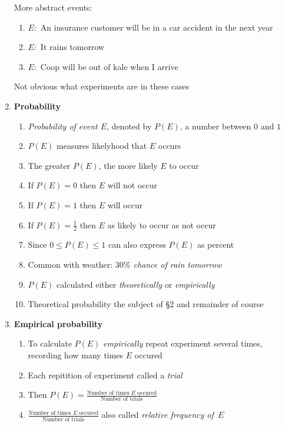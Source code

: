 \documentclass{ximera}
\begin{document}
\begin{enumerate}
\begin{example}
More abstract events:
\begin{enumerate}
\item $E:$ An insurance customer will be in a car accident in the next year
\item $E:$ It rains tomorrow
\item $E:$ Coop will be out of kale when I arrive
\end{enumerate}
Not obvious what experiments are in these cases
\end{example}

\item{\bf Probability}
\begin{enumerate}
\item {\em Probability of event $E$}, denoted by $P\left(E\right)$,
a number between $0$ and $1$
\item $P\left(E\right)$ measures likelyhood that $E$ occurs
\item The greater $P\left(E\right)$, the more likely $E$ to occur
\item If $P\left(E\right)=0$ then $E$ will not occur
\item If $P\left(E\right)=1$ then $E$ will occur
\item If $P\left(E\right)=\frac{1}{2}$ then $E$ 
as likely to occur as not occur
\item Since $0\le P\left(E\right)\le 1$ can also express
$P\left(E\right)$ as percent
\item Common with weather: {\em $30\%$ chance of rain tomorrow}
\item $P\left(E\right)$ calculated either {\em theoretically}
or {\em empirically}
\item Theoretical probability the subject of \S2 and remainder of course
\end{enumerate}

\item{\bf Empirical probability}
\begin{enumerate}
\item To calculate $P\left(E\right)$ {\em empirically}
repeat experiment several times, recording how
many times $E$ occured
\item Each repitition of experiment called a {\em trial}
\item Then $P\left(E\right)=
\frac{\text{Number of times $E$ occured}}
{\text{Number of trials}}$
\item $\frac{\text{Number of times $E$ occured}}
{\text{Number of trials}}$ also called
{\em relative frequency of~$E$}
\end{enumerate}


\end{enumerate}
\end{document}
